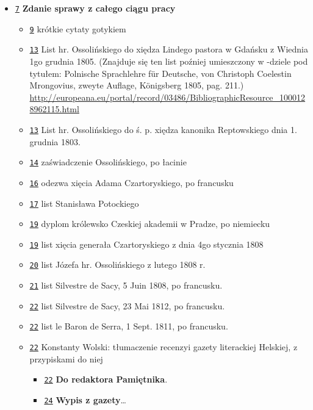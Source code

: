 \documentclass[12]{mwart}
\begin{document}
\begin{itemize}
\item \href{\pavia{6-1}{9}}{\texttt{7}} \textbf{Zdanie sprawy z całego ciągu pracy}
  \begin{itemize}
   \item \href{\pavia{6-1}{11}}{\texttt{9}} krótkie cytaty gotykiem
   \item \href{\pavia{6-1}{15}}{\texttt{13}} List hr. Ossolińskiego do
     xiędza Lindego pastora w Gdańsku z Wiednia 1go grudnia
     1805. (Znajduje się ten list poźniej umieszczony w -dziele pod
     tytułem: Polnische Sprachlehre für Deutsche, von Christoph
     Coelestin Mrongovius, zweyte Auflage, Königsberg 1805, pag. 211.)
     {\url{http://europeana.eu/portal/record/03486/BibliographicResource_1000128962115.html}}
   \item \href{\pavia{6-1}{15}}{\texttt{13}} List hr. Ossolińskiego do
     ś. p. xiędza kanonika Reptowskiego dnia 1. grudnia 1803.
   \item \href{\pavia{6-1}{16}}{\texttt{14}} zaświadczenie Ossolińskiego, po łacinie
   \item \href{\pavia{6-1}{18}}{\texttt{16}} odezwa xięcia Adama Czartoryskiego, po francusku
   \item \href{\pavia{6-1}{19}}{\texttt{17}} list Stanisława Potockiego
   \item \href{\pavia{6-1}{21}}{\texttt{19}} dyplom królewsko Czeskiej akademii w Pradze, po niemiecku
   \item \href{\pavia{6-1}{21}}{\texttt{19}} list xięcia generała Czartoryskiego z dnia 4go stycznia 1808
   \item \href{\pavia{6-1}{22}}{\texttt{20}} list Józefa hr. Ossolińskiego z lutego 1808 r.
   \item \href{\pavia{6-1}{23}}{\texttt{21}} list Silvestre de Sacy, 5 Juin 1808, po francusku.
   \item \href{\pavia{6-1}{25}}{\texttt{22}} list Silvestre de Sacy, 23 Mai 1812, po francusku.
   \item \href{\pavia{6-1}{25}}{\texttt{22}} list le Baron de Serra, 1
     Sept. 1811, po francusku.
   \item \href{\pavia{6-1}{25}}{\texttt{22}} Konstanty Wolski: tłumaczenie recenzyi
     gazety literackiej Helskiej, z przypiskami do niej
     \begin{itemize}
     \item \href{\pavia{6-1}{25}}{\texttt{22}} \textbf{Do redaktora Pamiętnika}.
     \item \href{\pavia{6-1}{26}}{\texttt{24}} \textbf{Wypis z gazety}\ldots

\end{itemize}
\end{itemize}
\end{itemize}
\end{document}
